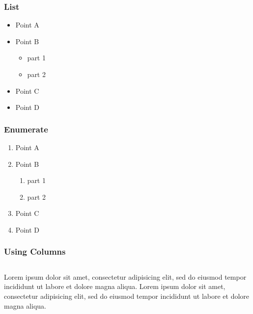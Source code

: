 \documentclass[xcolor=dvipsnames,10pt]{beamer}
\begin{document}
  \begin{frame}
  \frametitle{List}
  \begin{itemize}
  \item Point A
  \item Point B
  \begin{itemize}
  \item part 1
  \item part 2
  \end{itemize}
  \item Point C
  \item Point D
  \end{itemize}
  \end{frame}

  \begin{frame}
    \frametitle{Enumerate}
    \begin{enumerate}[]
  \item Point A
  \item Point B
  \begin{enumerate}[i]
  \item part 1
  \item part 2
  \end{enumerate}
  \item Point C
  \item Point D
  \end{enumerate}
  \end{frame}

  \begin{frame}
  \frametitle{Using Columns}
  \begin{columns}
  Lorem ipsum dolor sit amet, consectetur adipisicing elit, sed do eiusmod tempor incididunt ut labore et dolore magna aliqua.
  Lorem ipsum dolor sit amet, consectetur adipisicing elit, sed do eiusmod tempor incididunt ut labore et dolore magna aliqua.
  \end{columns}
  \end{frame}
\end{document}
